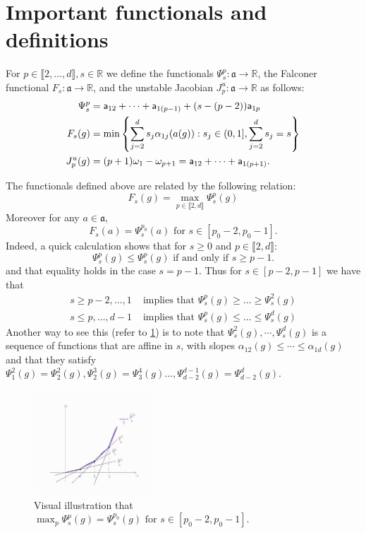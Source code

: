 \documentclass{report}
\begin{document}
\section{Important functionals and definitions}
\begin{definition}
For $p \in \llbracket 2, \ldots, d \rrbracket, s\in \mathbb R $
we define the functionals $\Psi_s^p: \mathfrak a \to \mathbb R$, the Falconer functional $F_s: \mathfrak a \to \mathbb R$, and the unstable Jacobian $J_p^u: \mathfrak a \to \mathbb R$ as follows:
\begin{align*}
\Psi_s^p &= 
    {\sf a}_{12} + \cdots + {\sf a}_{1(p-1)} + (s - (p-2)){\sf a}_{1p}\\
F_s(g) &= \min 
    \left\{
        \sum_{j=2}^d s_j \alpha_{1j}(a(g)) : s_j \in (0,1], \sum_{j=2}^d s_j = s 
    \right\}\\
J_p^u(g) &= (p+1)\omega_1 - \omega_{p+1} =
{\sf a}_{12} + \cdots + {\sf a}_{1(p+1)}.
\end{align*}
\end{definition}

\begin{remark}
The functionals defined above are related by the following relation:
\[
    F_s(g) = \max_{p \in \llbracket 2, d \rrbracket} \Psi_s^p(g)
\]
Moreover for any $a \in \mathfrak a$,
\[
    F_s(a) = \Psi_s^{p_0}(a) \text{ for } s \in [p_0 - 2, p_0 -1].
\]
Indeed, a quick calculation shows that for $s \geq 0$ and $p \in \llbracket 2, d \rrbracket$:
\[
    \Psi_s^p(g) \leq \Psi_s^p(g) \text{ if and only if } s \geq p-1.
\]
and that equality holds in the case $s = p - 1$.
Thus for $s \in [p - 2, p-1]$ we have that
\begin{align*}
    s \geq p-2, \ldots, 1 &\text{ implies that } \Psi_s^p(g) \geq \ldots \geq \Psi_s^{2}(g)\\
    s \leq p, \ldots, d-1 &\text{ implies that } \Psi_s^p(g) \leq \ldots \leq \Psi_s^d(g)
\end{align*}
Another way to see this (refer to \cref{fig:max}) is to note that $\Psi_s^2(g), \cdots, \Psi_s^d(g)$ is a sequence of functions that are affine in $s$, with slopes $\alpha_{12}(g) \leq \cdots \leq \alpha_{1d}(g)$ and that they satisfy $\Psi_1^2(g) = \Psi_2^2(g), \Psi_2^3(g) = \Psi_3^4(g) \ldots, \Psi_{d-2}^{d-1}(g) = \Psi_{d-2}^d(g)$.
\begin{figure}[h]
    \centering
    \includegraphics[width=0.4\textwidth]{max.jpg}
    \caption{Visual illustration that $\max_p\Psi_s^p(g) = \Psi_s^{p_0}(g) \text{ for } s \in [p_0 - 2, p_0 -1]$.}
    \label{fig:max}
\end{figure}    
\end{remark}
\end{document}
